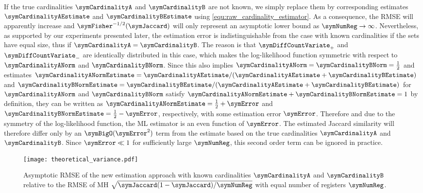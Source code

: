 \documentclass[sigconf, nonacm]{acmart}
\begin{document}
If the true cardinalities $\symCardinalityA$ and $\symCardinalityB$ are not known, we simply replace them by corresponding estimates $\symCardinalityAEstimate$ and $\symCardinalityBEstimate$ using \eqref{equ:raw_cardinality_estimator}.
As a consequence, the \ac{RMSE} will apparently increase and $\symFisher^{-1/2}(\symJaccard)$ will only represent an asymptotic lower bound as $\symNumReg\rightarrow\infty$. Nevertheless, as supported by our experiments presented later, the estimation error is indistinguishable from the case with known cardinalities if the sets have equal size, thus if $\symCardinalityA=\symCardinalityB$. The reason is that $\symDiffCountVariate_{+}$ and $\symDiffCountVariate_{-}$ are identically distributed in this case, which makes the log-likelihood function symmetric with respect to $\symCardinalityANorm$ and $\symCardinalityBNorm$. Since this also implies $\symCardinalityANorm=\symCardinalityBNorm=\frac{1}{2}$ and estimates $\symCardinalityANormEstimate=\symCardinalityAEstimate/(\symCardinalityAEstimate+\symCardinalityBEstimate)$ and $\symCardinalityBNormEstimate=\symCardinalityBEstimate/(\symCardinalityAEstimate+\symCardinalityBEstimate)$ for $\symCardinalityANorm$ and $\symCardinalityBNorm$ satisfy $\symCardinalityANormEstimate+\symCardinalityBNormEstimate=1$ by definition, they can be written as $\symCardinalityANormEstimate=\frac{1}{2} + \symError$ and $\symCardinalityBNormEstimate=\frac{1}{2} - \symError$, respectively, with some estimation error $\symError$. Therefore and due to the symmetry of the log-likelihood function, the \ac{ML} estimator is an even function of $\symError$. The estimated Jaccard similarity will therefore differ only by an $\symBigO(\symError^2)$ term from the estimate based on the true cardinalities $\symCardinalityA$ and $\symCardinalityB$. Since $\symError\ll 1$ for sufficiently large $\symNumReg$, this second order term can be ignored in practice.

\begin{figure}[t]
  \centering
  \texttt{[image: theoretical\_variance.pdf]}
  \caption{\boldmath Asymptotic \acs*{RMSE} of the new estimation approach with known cardinalities $\symCardinalityA$ and $\symCardinalityB$ relative to the \acs*{RMSE} of \acs*{MH} $\sqrt{\symJaccard(1-\symJaccard)/\symNumReg}$ with equal number of registers $\symNumReg$.}
  \label{fig:theoretical_variance}
\end{figure}
\end{document}
